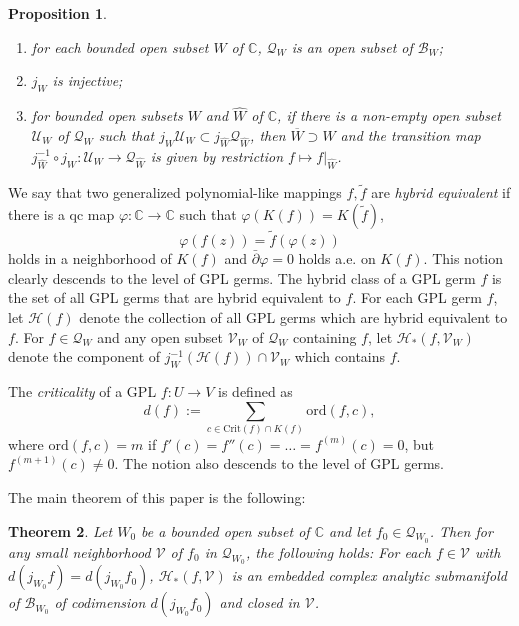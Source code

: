 \documentclass{amsart}
\numberwithin{equation}{section}
\newtheorem{theorem}{Theorem}[section]
\newtheorem{proposition}[theorem]{Proposition}%
\newcommand{\C}{\mathbb C}
\theoremstyle{definition}
\theoremstyle{remark}
\begin{document}
\begin{proposition}\label{prop:cpxstr}
\begin{enumerate}
\item for each bounded open subset $W$ of $\C$, $\mathcal{Q}_W$ is an open subset of $\mathcal{B}_W$;
\item $j_W$ is injective; 
\item for bounded open subsets $W$ and $\widehat{W}$ of $\C$, if there is a non-empty open subset $\mathcal{U}_W$ of $\mathcal{Q}_W$ such that $j_W\mathcal{U}_W\subset j_{\widehat{W}} \mathcal{Q}_{\widehat{W}}$, then $\overline{W}\supset \widehat{W}$ and the transition map $j_{\widehat{W}}^{-1}\circ j_{W}: \mathcal{U}_W\to \mathcal{Q}_{\widehat{W}}$ is given by restriction $f\mapsto f|_{\widehat{W}}$. 
\end{enumerate}
\end{proposition}



We say that two generalized polynomial-like mappings $f,\widetilde{f}$ are {\em hybrid equivalent} if there is a qc map $\varphi:\mathbb{C}\to \mathbb{C}$ such that 
$\varphi(K(f))=K(\widetilde{f})$, 
\begin{equation}\label{eqn:conjugacy}
\varphi (f(z))=\widetilde{f}(\varphi(z))
\end{equation}
holds in a neighborhood of $K(f)$ and $\bar{\partial} \varphi=0$ holds a.e. on $K(f)$. This notion clearly descends to the level of GPL germs. The hybrid class of a GPL germ $f$ is the set of all GPL germs that are hybrid equivalent to $f$. 
For each GPL germ $f$, let $\mathcal{H}(f)$ denote the collection of all GPL germs which are hybrid equivalent to $f$. For $f\in \mathcal{Q}_W$ and any open subset $\mathcal{V}_W$ of $\mathcal{Q}_W$ containing $f$, let $\mathcal{H}_*(f,\mathcal{V}_W)$ denote the component of $j_W^{-1}(\mathcal{H}(f))\cap \mathcal{V}_W$  which contains $f$. 

The {\em criticality} of a GPL $f:U\to V$ is defined as 
\begin{equation}\label{eqn:criticality}
d(f):=\sum_{c\in \text{Crit}(f)\cap K(f)} \text{ord}(f,c),
\end{equation}
where $\text{ord}(f,c)=m$ if $f'(c)=f''(c)=\dots=f^{(m)}(c)=0$, but $f^{(m+1)}(c)\not=0$. 
The notion also descends to the level of GPL germs. 

The main theorem of this paper is the following:
\begin{theorem}\label{thm:hybridclass} Let $W_0$ be a bounded open subset of $\C$ and let $f_0\in \mathcal{Q}_{W_0}$. Then for any small neighborhood $\mathcal{V}$ of $f_0$ in $\mathcal{Q}_{W_0}$, the following holds: For each $f\in \mathcal{V}$ with $d(j_{W_0}f)=d(j_{W_0}f_0)$,  $\mathcal{H}_*(f,\mathcal{V})$ is an embedded complex analytic submanifold of $\mathcal{B}_{W_0}$ of codimension $d(j_{W_0} f_0)$ and closed in $\mathcal{V}$.    
\end{theorem}
\end{document}
